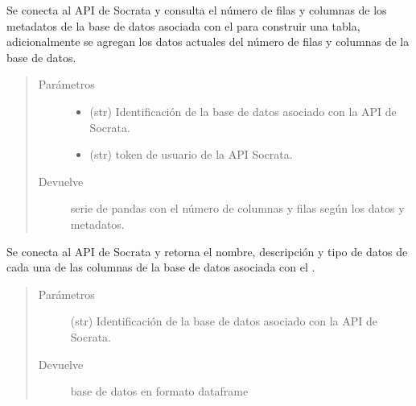 \documentclass[letterpaper,10pt,openany,spanish]{sphinxmanual}
\begin{document}

\begin{fulllineitems}
\label{\detokenize{metadatos:metadatos.compare_meta}}
Se conecta al API de Socrata y consulta el número de filas y columnas de los metadatos de la base de datos asociada con el  para construir una tabla, adicionalmente se agregan los datos actuales del número de filas y columnas de la base de datos.
\begin{quote}\begin{description}
\item[{Parámetros}] \leavevmode\begin{itemize}
\item {} 
 \textendash{} (str) Identificación de la base de datos asociado con la API de Socrata.

\item {} 
 \textendash{} (str)  \sphinxhyphen{} token de usuario de la API Socrata.

\end{itemize}

\item[{Devuelve}] \leavevmode
serie de pandas con el número de columnas y filas según los datos y metadatos.

\end{description}\end{quote}

\end{fulllineitems}


\begin{fulllineitems}
\label{\detokenize{metadatos:metadatos.info_cols_meta}}
Se conecta al API de Socrata y retorna el nombre, descripción y tipo de datos de cada una de las columnas de la base de datos asociada con el .
\begin{quote}\begin{description}
\item[{Parámetros}] \leavevmode
{} \textendash{} (str) Identificación de la base de datos asociado con la API de Socrata.

\item[{Devuelve}] \leavevmode
base de datos en formato dataframe

\end{description}\end{quote}

\end{fulllineitems}
\end{document}
